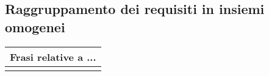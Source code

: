\subsection*{Raggruppamento dei requisiti in insiemi omogenei}
%
%
\begin{tabularx}{\linewidth}{|X|}
    \hline
    \rowcolor{tblhdrcolor}
    \textbf{Frasi relative a ...} \\\hline
    \\ \hline
\end{tabularx}
